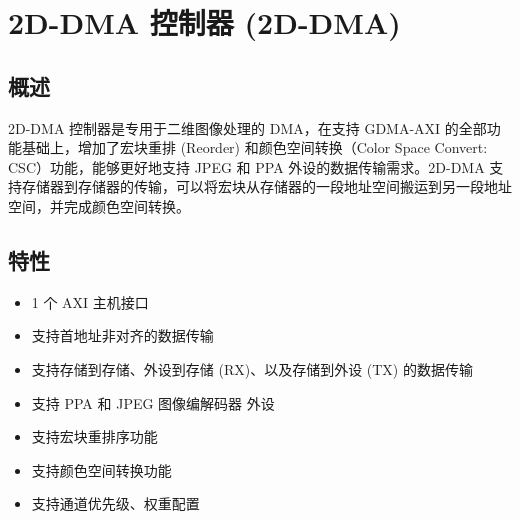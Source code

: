 \documentclass[main\_\_CN.tex]{subfiles}
\begin{document}

\ifglobal
\else
    {\let\clearpage\relax \listoftodos}
    {\let\clearpage\relax \listofdonetodos}
    \tableofcontents
\fi



\hypertarget{2ddma}{}
\chapter{2D-DMA 控制器 (2D-DMA)}
\label{mod:2ddma}


\section{概述}

2D-DMA 控制器是专用于二维图像处理的 DMA，在支持 GDMA-AXI 的全部功能基础上，增加了宏块重排 (Reorder) 和颜色空间转换（Color Space Convert: CSC）功能，能够更好地支持 JPEG 和 PPA 外设的数据传输需求。2D-DMA 支持存储器到存储器的传输，可以将宏块从存储器的一段地址空间搬运到另一段地址空间，并完成颜色空间转换。


\section{特性}
\label{sec:2ddma-features}

\begin{itemize}
    \item 1 个 AXI 主机接口
    \item 支持首地址非对齐的数据传输
    \item 支持存储到存储、外设到存储 (RX)、以及存储到外设 (TX) 的数据传输
    \item 支持 PPA 和 JPEG 图像编解码器 外设
    \item 支持宏块重排序功能
    \item 支持颜色空间转换功能
    \item 支持通道优先级、权重配置
\end{itemize}
\end{document}
